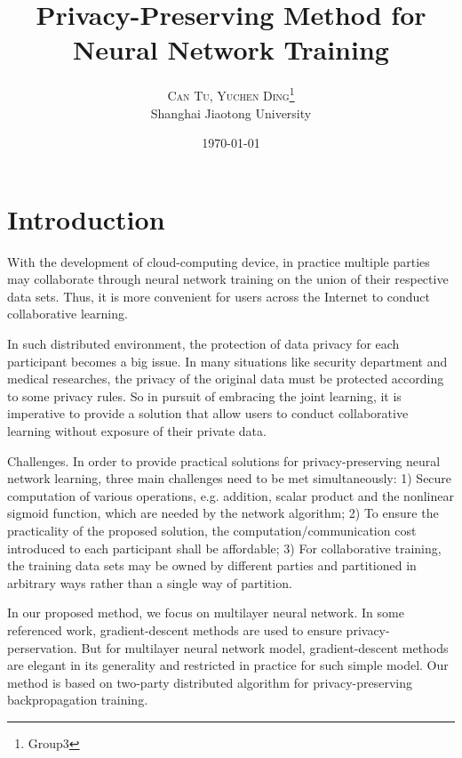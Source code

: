 \documentclass[twoside,twocolumn]{article}
\title{Privacy-Preserving Method for Neural Network Training }
\author{%
\textsc{Can Tu, Yuchen Ding}\thanks{Group3} \\[1ex] %
\normalsize Shanghai Jiaotong University \\
}
\date{\today} %
\begin{document}
\maketitle


\section{Introduction}
With the development of cloud-computing device, in practice multiple parties may collaborate through neural network training on the union of their respective data sets. Thus, it is more convenient for users across the Internet to conduct collaborative learning.

In such distributed environment, the protection of data privacy for each participant becomes a big issue. In many situations like security department and medical researches, the privacy of the original data must be protected according to some privacy rules. So in pursuit of embracing the joint learning, it is imperative to provide a solution that allow users to conduct collaborative learning without exposure of their private data.

Challenges. In order to provide practical solutions for privacy-preserving neural network learning, three main challenges need to be met simultaneously: 1) Secure computation of various operations, e.g. addition, scalar product and the nonlinear sigmoid function, which are needed by the network algorithm; 2) To ensure the practicality of the proposed solution, the computation/communication cost introduced to each participant shall be affordable; 3) For collaborative training, the training data sets may be owned by different parties and partitioned in arbitrary ways rather than a single way of partition.

In our proposed method, we focus on multilayer neural network. In some referenced work, gradient-descent methods are used to ensure privacy-perservation. But for multilayer neural network model, gradient-descent methods are elegant in its generality and restricted in practice for such simple model. Our method is based on two-party distributed algorithm for privacy-preserving backpropagation training.
\end{document}
